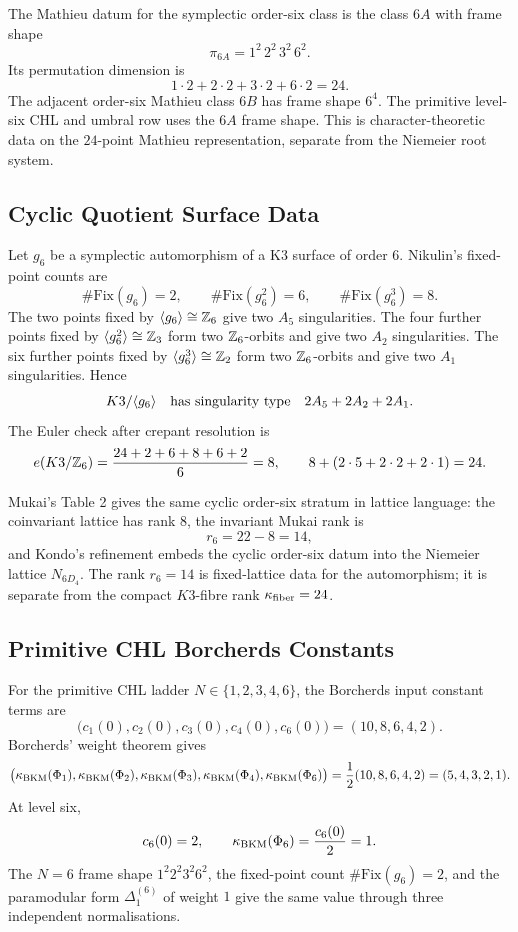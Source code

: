 The Mathieu datum for the symplectic order-six class is the class \(6A\)
with frame shape
\[
\pi_{6A}=1^2\,2^2\,3^2\,6^2 .
\]
Its permutation dimension is
\[
1\cdot 2+2\cdot 2+3\cdot 2+6\cdot 2=24.
\]
The adjacent order-six Mathieu class \(6B\) has frame shape \(6^4\).
The primitive level-six CHL and umbral row uses the \(6A\) frame shape.
This is character-theoretic data on the \(24\)-point Mathieu
representation, separate from the Niemeier root system.

\subsection*{Cyclic Quotient Surface Data}

Let \(g_6\) be a symplectic automorphism of a K3 surface of order \(6\).
Nikulin's fixed-point counts are
\[
\#\mathrm{Fix}(g_6)=2,\qquad
\#\mathrm{Fix}(g_6^2)=6,\qquad
\#\mathrm{Fix}(g_6^3)=8 .
\]
The two points fixed by \(\langle g_6\rangle\cong\mathbb{Z}_6\) give two
\(A_5\) singularities. The four further points fixed by
\(\langle g_6^2\rangle\cong\mathbb{Z}_3\) form two \(\mathbb{Z}_6\)-orbits and give two
\(A_2\) singularities. The six further points fixed by
\(\langle g_6^3\rangle\cong\mathbb{Z}_2\) form two \(\mathbb{Z}_6\)-orbits and give two
\(A_1\) singularities. Hence
\[
K3/\langle g_6\rangle
\quad\hbox{has singularity type}\quad
2A_5+2A_2+2A_1 .
\]
The Euler check after crepant resolution is
\[
e(K3/\mathbb{Z}_6)=\frac{24+2+6+8+6+2}{6}=8,\qquad
8+(2\cdot5+2\cdot2+2\cdot1)=24 .
\]

Mukai's Table 2 gives the same cyclic order-six stratum in lattice
language: the coinvariant lattice has rank \(8\), the invariant Mukai
rank is
\[
r_6=22-8=14,
\]
and Kondo's refinement embeds the cyclic order-six datum into the
Niemeier lattice \(N_{6D_4}\). The rank \(r_6=14\) is fixed-lattice
data for the automorphism; it is separate from the compact \(K3\)-fibre
rank \(\kappa_{\mathrm{fiber}}=24\).

\subsection*{Primitive CHL Borcherds Constants}

For the primitive CHL ladder \(N\in\{1,2,3,4,6\}\), the Borcherds input
constant terms are
\[
\bigl(c_1(0),c_2(0),c_3(0),c_4(0),c_6(0)\bigr)
=(10,8,6,4,2).
\]
Borcherds' weight theorem gives
\[
\bigl(\kappa_{\mathrm{BKM}}(\Phi_1),\kappa_{\mathrm{BKM}}(\Phi_2),\kappa_{\mathrm{BKM}}(\Phi_3),
\kappa_{\mathrm{BKM}}(\Phi_4),\kappa_{\mathrm{BKM}}(\Phi_6)\bigr)
=\frac12(10,8,6,4,2)=(5,4,3,2,1).
\]
At level six,
\[
c_6(0)=2,\qquad \kappa_{\mathrm{BKM}}(\Phi_6)=\frac{c_6(0)}2=1 .
\]
The \(N=6\) frame shape \(1^2 2^2 3^2 6^2\), the fixed-point count
\(\#\mathrm{Fix}(g_6)=2\), and the paramodular form
\(\Delta_1^{(6)}\) of weight \(1\) give the same value through three
independent normalisations.

